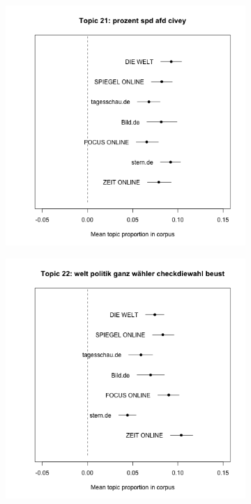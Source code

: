 \documentclass[12pt,a4paper,notitlepage]{article}
\begin{document}
\begin{figure}[H]
\begin{center}
\begin{subfigure}[normla]{0.2\textwidth}
		\end{subfigure}
		\begin{subfigure}[normla]{0.2\textwidth}
			\includegraphics[width=\textwidth]{../figs/estimate_effect21.png}
		\end{subfigure}
		\begin{subfigure}[normla]{0.2\textwidth}
			\includegraphics[width=\textwidth]{../figs/estimate_effect22.png}

\end{subfigure}
\end{center}
\end{figure}
\end{document}
